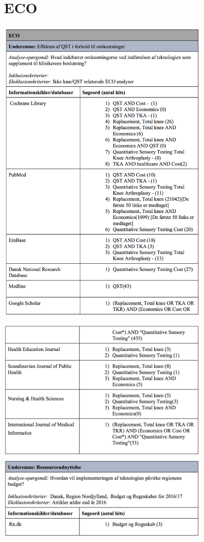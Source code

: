 \section{ECO}\label{ECO_sog}
\begin{center}
	\includegraphics[width=0.8\textwidth]{rapportAfsnit/qBilag/sogninger/ECO1}
	
	\includegraphics[width=0.8\textwidth]{rapportAfsnit/qBilag/sogninger/ECO2}
\end{center}

